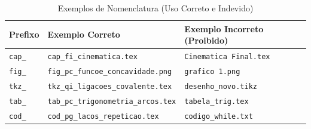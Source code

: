 \begin{table}[h]
    \centering
    \caption{Exemplos de Nomenclatura (Uso Correto e Indevido)}
    \label{tab:niv_tutorial_nomenclatura_exemplos}
    \begin{tabular}{lll}
        \hline
        \textbf{Prefixo} & \textbf{Exemplo Correto} & \textbf{Exemplo Incorreto (Proibido)} \\
        \hline
        \texttt{cap\_} & \texttt{cap\_fi\_cinematica.tex} & \texttt{Cinematica Final.tex} \\
        \texttt{fig\_} & \texttt{fig\_pc\_funcoe\_concavidade.png} & \texttt{grafico 1.png} \\
        \texttt{tkz\_} & \texttt{tkz\_qi\_ligacoes\_covalente.tex} & \texttt{desenho\_novo.tikz} \\
        \texttt{tab\_} & \texttt{tab\_pc\_trigonometria\_arcos.tex} & \texttt{tabela\_trig.tex} \\
        \texttt{cod\_} & \texttt{cod\_pg\_lacos\_repeticao.tex} & \texttt{codigo\_while.txt} \\
        \hline
    \end{tabular}
    
    \fonteNivelamento
\end{table}